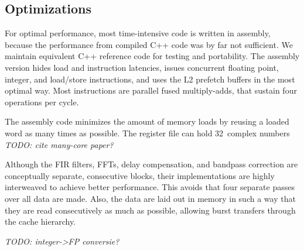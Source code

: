 \documentclass[10pt]{article}
\begin{document}
\subsection{Optimizations}

For optimal performance, most time-intensive code is written in assembly,
because the performance from compiled C++ code was by far not sufficient.
We maintain equivalent C++ reference code for testing and portability.
The assembly version hides load and instruction latencies, issues concurrent
floating point, integer, and load/store instructions,
and uses the L2 prefetch buffers in the most optimal way.
Most instructions are parallel fused multiply-adds, that sustain four
operations per cycle.

The assembly code minimizes the amount of memory loads by reusing a loaded
word as many times as possible.
The register file can hold 32~complex numbers \emph{TODO: cite many-core paper?}

Although the FIR filters, FFTs, delay compensation, and bandpass correction
are conceptually separate, consecutive blocks, their implementations are
highly interweaved to achieve better performance.
This avoids that four separate passes over all data are made.
Also, the data are laid out in memory in such a way that they are read
consecutively as much as possible, allowing burst transfers through the
cache hierarchy.

\emph{TODO: integer->FP conversie?}






\end{document}
